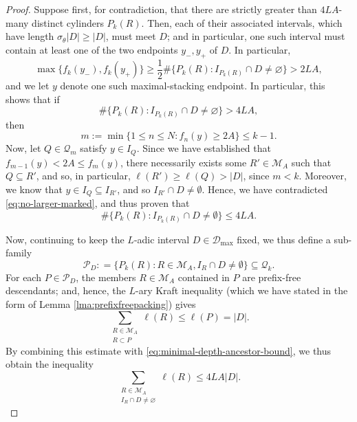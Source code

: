 \documentclass[10pt,a4paper]{amsart}
\newcommand{\I}{\mathbb I}
\newcommand{\R}{\mathbb{R}}
\begin{document}
\begin{proof}
Suppose first, for contradiction, that there are strictly greater than $4LA$-many distinct cylinders $P_k(R)$. Then, each of their associated intervals, which have length $\sigma_\theta|D|\geq|D|$, must meet $D$; and in particular, one such interval must contain at least one of the two endpoints $y_-, y_+$ of $D$. In particular, 
\[
\max \{f_k(y_-), f_k(y_+)\} \geq\frac12\#\{P_k(R):I_{P_k(R)}\cap D\neq\varnothing\}>2LA,
\]
and we let $y$ denote one such maximal-stacking endpoint.
In particular, this shows that if
$$
\#\{P_k(R):I_{P_k(R)}\cap D\neq\varnothing\} > 4LA,
$$
then
\begin{equation}\label{eq:contradiction-index}
m :=\min \big\{1 \leq n \leq N : f_n (y) \geq 2 A\big\} \leq k - 1.
\end{equation}
Now, let $Q \in \mathscr{Q}_m$ satisfy $y \in I_Q$. Since we have established that $f_{m-1} (y) < 2 A \leq f_m (y)$, there necessarily exists some $R' \in \mathscr{M}_A$ such that $Q \subseteq R'$, and so, in particular, $\ell (R') \geq \ell (Q) > |D|$, since $m < k$. Moreover, we know that $y \in I_Q \subseteq I_{R'}$, and so $I_{R'} \cap D \neq \emptyset$. Hence, we have contradicted \eqref{eq:no-larger-marked}, and thus proven that
\begin{equation}\label{eq:minimal-depth-ancestor-bound}
\# \{P_k (R) : I_{P_k(R)} \cap D \neq \emptyset \} \leq 4LA.
\end{equation}

Now, continuing to keep the $L$-adic interval $D \in \mathcal{D}_{\max}$ fixed, we thus define a sub-family
$$
\mathscr{P}_D : = \big\{P_k (R) : R \in \mathscr{M}_A, I_R \cap D \neq \emptyset \} \subseteq \mathscr{Q}_k.
$$
For each $P\in \mathscr{P}_D$, the members $R \in \mathscr M_A$ contained in $P$ are prefix-free descendants; and, hence, the $L$-ary Kraft inequality (which we have stated in the form of Lemma \ref{lma:prefixfreepacking}) gives
$$
 \sum_{\substack{R\in\mathscr M_A\\R\subset P}}\ell(R)\leq\ell(P)=|D|.
$$
By combining this estimate with \eqref{eq:minimal-depth-ancestor-bound}, we thus obtain the inequality
\begin{equation}\label{eq:local-packing}
 \sum_{\substack{R\in\mathscr M_A\\I_R\cap D\neq\varnothing}}\ell(R)
 \leq4LA|D|.
\end{equation}


\end{proof}
\end{document}
